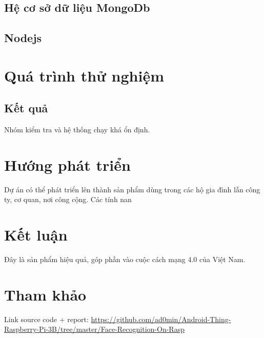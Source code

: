 \documentclass[a4paper]{article}
\begin{document}
\subsection{Hệ cơ sở dữ liệu MongoDb}
\subsection{Nodejs}


\section{Quá trình thử nghiệm}

\subsection{Kết quả}
\hspace{6mm} Nhóm kiểm tra và hệ thống chạy khá ổn định.

\section{Hướng phát triển}
Dự án có thể phát triển lên thành sản phẩm dùng trong các hộ gia đình lẫn công ty, cơ quan, nơi công cộng. Các tính nan

\section{Kết luận}
Đây là sản phẩm hiệu quả, góp phần vào cuộc cách mạng 4.0 của Việt Nam.

\section{Tham khảo}
Link source code + report: \url{https://github.com/ad0min/Android-Thing-Raspberry-Pi-3B/tree/master/Face-Recognition-On-Rasp}


 
\end{document}
